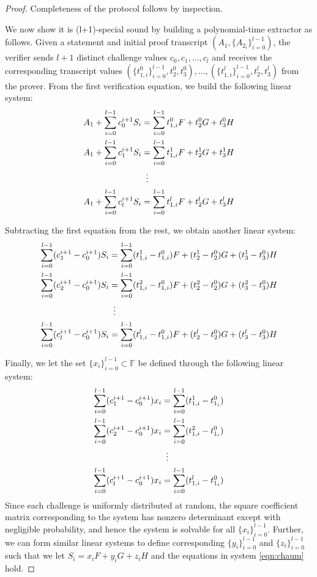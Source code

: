 \documentclass{llncs}
\newcommand{\F}{\mathbb{F}}
\begin{document}
\begin{proof}
Completeness of the protocol follows by inspection.

We now show it is (l+1)-special sound by building a polynomial-time extractor as follows.
Given a statement and initial proof transcript $(A_1, \{A_{2_i}\}_{i=0}^{l-1})$, the verifier sends $l+1$ distinct challenge values $c_0, c_1, \ldots, c_l$ and receives the corresponding transcript values $(\{t^0_{1,i}\}_{i=0}^{l-1}, t^0_2, t^0_3), \ldots, (\{t^l_{1,i}\}_{i=0}^{l-1}, t^l_2, t^l_3)$ from the prover.
From the first verification equation, we build the following linear system:
\begin{align*}
A_1 + \sum_{i=0}^{l-1} c_0^{i+1} S_i &= \sum_{i=0}^{l-1} t^0_{1,i} F + t^0_2 G + t^0_3 H \\
A_1 + \sum_{i=0}^{l-1} c_1^{i+1} S_i &= \sum_{i=0}^{l-1} t^1_{1,i} F + t^1_2 G + t^1_3 H \\
&\vdotswithin{=} \\
A_1 + \sum_{i=0}^{l-1} c_l^{i+1} S_i &= \sum_{i=0}^{l-1} t^l_{1,i} F + t^l_2 G + t^l_3 H
\end{align*}

Subtracting the first equation from the rest, we obtain another linear system:
\begin{gather}
\begin{aligned}
\label{eqn:chaum}
\sum_{i=0}^{l-1} (c_1^{i+1} - c_0^{i+1}) S_i &= \sum_{i=0}^{l-1} (t^1_{1,i} - t^0_{1,i})F + (t^1_2 - t^0_2)G + (t^1_3 - t^0_3)H \\
\sum_{i=0}^{l-1} (c_2^{i+1} - c_0^{i+1}) S_i &= \sum_{i=0}^{l-1} (t^2_{1,i} - t^0_{1,i})F + (t^2_2 - t^0_2)G + (t^2_3 - t^0_3)H \\
&\vdotswithin{=} \\
\sum_{i=0}^{l-1} (c_l^{i+1} - c_0^{i+1}) S_i &= \sum_{i=0}^{l-1} (t^l_{1,i} - t^0_{1,i})F + (t^l_2 - t^0_2)G + (t^l_3 - t^0_3)H
\end{aligned}
\end{gather}

Finally, we let the set $\{x_i\}_{i=0}^{l-1} \subset \F$ be defined through the following linear system:
\begin{align*}
\sum_{i=0}^{l-1} (c_1^{i+1} - c_0^{i+1})x_i &= \sum_{i=0}^{l-1} (t^1_{1,i} - t^0_{1_i}) \\
\sum_{i=0}^{l-1} (c_2^{i+1} - c_0^{i+1})x_i &= \sum_{i=0}^{l-1} (t^2_{1,i} - t^0_{1_i}) \\
&\vdotswithin{=} \\
\sum_{i=0}^{l-1} (c_l^{i+1} - c_0^{i+1})x_i &= \sum_{i=0}^{l-1} (t^l_{1,i} - t^0_{1_i})
\end{align*}
Since each challenge is uniformly distributed at random, the square coefficient matrix corresponding to the system has nonzero determinant except with negligible probability, and hence the system is solvable for all $\{x_i\}_{i=0}^{l-1}$.
Further, we can form similar linear systems to define corresponding $\{y_i\}_{i=0}^{l-1}$ and $\{z_i\}_{i=0}^{l-1}$ such that we let $S_i = x_i F + y_i G + z_i H$ and the equations in system \ref{eqn:chaum} hold.


\end{proof}
\end{document}
